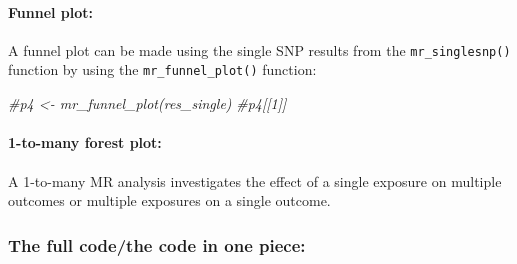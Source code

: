 \documentclass[
]{article}
\newenvironment{Shaded}{\begin{snugshade}}{\end{snugshade}}
\newcommand{\CommentTok}[1]{\textcolor[rgb]{0.56,0.35,0.01}{\textit{#1}}}
\begin{document}
\paragraph{Funnel plot:}\label{funnel-plot}

A funnel plot can be made using the single SNP results from the
\texttt{mr\_singlesnp()} function by using the
\texttt{mr\_funnel\_plot()} function:

\begin{Shaded}
\begin{Highlighting}[]
\CommentTok{\#p4 \textless{}{-} mr\_funnel\_plot(res\_single)}
\CommentTok{\#p4[[1]]}
\end{Highlighting}
\end{Shaded}

\paragraph{1-to-many forest plot:}\label{to-many-forest-plot}

A 1-to-many MR analysis investigates the effect of a single exposure on
multiple outcomes or multiple exposures on a single outcome.

\subsubsection{The full code/the code in one
piece:}\label{the-full-codethe-code-in-one-piece}
\end{document}
